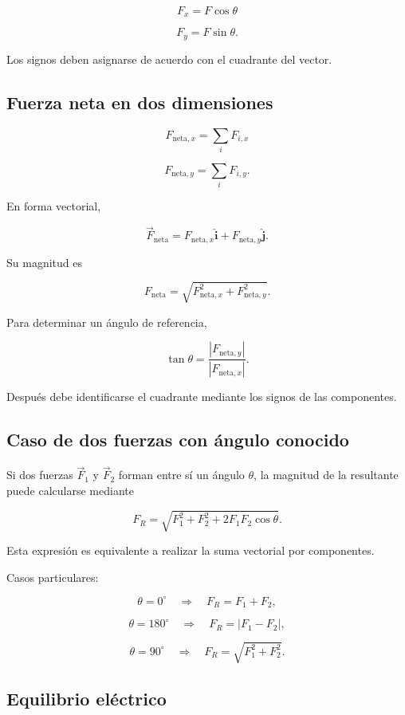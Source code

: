 \[
\boxed{F_x=F\cos\theta}
\]

\[
\boxed{F_y=F\sin\theta}.
\]

Los signos deben asignarse de acuerdo con el cuadrante del vector.


\subsection{Fuerza neta en dos dimensiones}

\[
\boxed{F_{\text{neta},x}=\sum_iF_{i,x}}
\]

\[
\boxed{F_{\text{neta},y}=\sum_iF_{i,y}}.
\]

En forma vectorial,

\[
\boxed{
\vec F_{\text{neta}}
=
F_{\text{neta},x}\hat{\mathbf i}
+
F_{\text{neta},y}\hat{\mathbf j}
}.
\]

Su magnitud es

\[
\boxed{
F_{\text{neta}}
=
\sqrt{
F_{\text{neta},x}^2+
F_{\text{neta},y}^2
}
}.
\]

Para determinar un ángulo de referencia,

\[
\boxed{
\tan\theta
=
\frac{|F_{\text{neta},y}|}
{|F_{\text{neta},x}|}
}.
\]

Después debe identificarse el cuadrante mediante los signos de las componentes.


\subsection{Caso de dos fuerzas con ángulo conocido}

Si dos fuerzas \(\vec F_1\) y \(\vec F_2\) forman entre sí un ángulo \(\theta\), la magnitud de la resultante puede calcularse mediante

\[
\boxed{
F_R=
\sqrt{
F_1^2+F_2^2+2F_1F_2\cos\theta
}
}.
\]

Esta expresión es equivalente a realizar la suma vectorial por componentes.

Casos particulares:

\[
\theta=0^\circ
\quad\Longrightarrow\quad
\boxed{F_R=F_1+F_2},
\]

\[
\theta=180^\circ
\quad\Longrightarrow\quad
\boxed{F_R=|F_1-F_2|},
\]

\[
\theta=90^\circ
\quad\Longrightarrow\quad
\boxed{F_R=\sqrt{F_1^2+F_2^2}}.
\]


\subsection{Equilibrio eléctrico}

